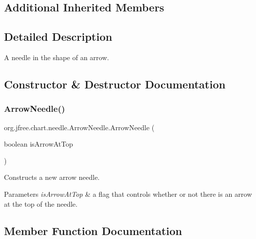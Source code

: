 \subsection*{Additional Inherited Members}


\subsection{Detailed Description}
A needle in the shape of an arrow. 

\subsection{Constructor \& Destructor Documentation}
\mbox{\label{classorg_1_1jfree_1_1chart_1_1needle_1_1_arrow_needle_a1def7455a0d620e9e3685ab0e757cb35}} 
\subsubsection{\texorpdfstring{Arrow\+Needle()}{ArrowNeedle()}}
{\footnotesize\ttfamily org.\+jfree.\+chart.\+needle.\+Arrow\+Needle.\+Arrow\+Needle (\begin{DoxyParamCaption}\item[{boolean}]{is\+Arrow\+At\+Top }\end{DoxyParamCaption})}

Constructs a new arrow needle.


\begin{DoxyParams}{Parameters}
{\em is\+Arrow\+At\+Top} & a flag that controls whether or not there is an arrow at the top of the needle. \\
\hline
\end{DoxyParams}


\subsection{Member Function Documentation}
\mbox{\label{classorg_1_1jfree_1_1chart_1_1needle_1_1_arrow_needle_a6627aeb96f6d834e35a86105aeebfe0c}} 
